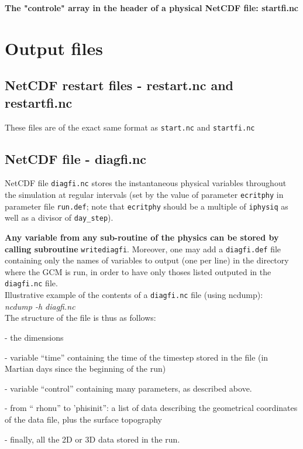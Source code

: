 \noindent
{\bf The "controle" array in the header of a physical NetCDF file:
startfi.nc}

 
\newpage
\section{Output files}

\subsection{NetCDF restart files - restart.nc and restartfi.nc}
These files are of the exact same format as {\tt start.nc} and
{\tt startfi.nc}

\subsection{ NetCDF file - diagfi.nc}
NetCDF file {\tt diagfi.nc} stores the instantaneous physical variables
throughout the simulation at regular intervals
(set by the value of parameter {\tt ecritphy} in 
parameter file {\tt run.def}; note that {\tt ecritphy} should be a
multiple of {\tt iphysiq} as well as a divisor of {\tt day\_step}).

\noindent
{\bf Any variable from any sub-routine of the physics can be stored
by calling subroutine} {\tt writediagfi}.
Moreover, one may add a {\tt diagfi.def} file containing only the names
of variables to output (one per line) in the directory where the GCM is
run, in order to have only thoses listed outputed in the {\tt diagfi.nc}
file.\\

\noindent
Illustrative example of the contents of a {\tt diagfi.nc}
file (using ncdump):\\
\noindent
{\it ncdump -h diagfi.nc}\\


\noindent
The structure of the file is thus as follows: 
\begin{description}
\item- the dimensions 
\item- variable ``time'' containing the time of the timestep stored in the
 file (in Martian days since the beginning of the run)
\item- variable ``control'' containing many parameters, as described above.
\item- from `` rhonu'' to 'phisinit'': a list of data describing the
 geometrical coordinates of the data file, plus the surface topography
\item- finally, all the 2D or 3D data stored in the run. 
\end{description}


